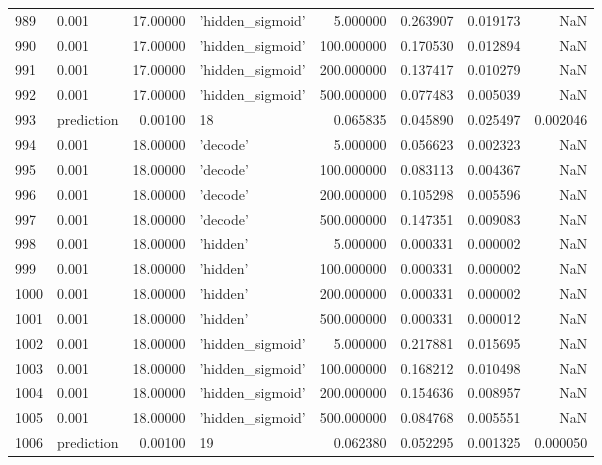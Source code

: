 \documentclass[10pt,a4paper]{article}
\begin{document}
\begin{tabular}{llrlrrrr}
989  &       0.001 &  17.00000 &   'hidden\_sigmoid' &    5.000000 &  0.263907 &  0.019173 &       NaN \\
990  &       0.001 &  17.00000 &   'hidden\_sigmoid' &  100.000000 &  0.170530 &  0.012894 &       NaN \\
991  &       0.001 &  17.00000 &   'hidden\_sigmoid' &  200.000000 &  0.137417 &  0.010279 &       NaN \\
992  &       0.001 &  17.00000 &   'hidden\_sigmoid' &  500.000000 &  0.077483 &  0.005039 &       NaN \\
993  &  prediction &   0.00100 &                 18 &    0.065835 &  0.045890 &  0.025497 &  0.002046 \\
994  &       0.001 &  18.00000 &           'decode' &    5.000000 &  0.056623 &  0.002323 &       NaN \\
995  &       0.001 &  18.00000 &           'decode' &  100.000000 &  0.083113 &  0.004367 &       NaN \\
996  &       0.001 &  18.00000 &           'decode' &  200.000000 &  0.105298 &  0.005596 &       NaN \\
997  &       0.001 &  18.00000 &           'decode' &  500.000000 &  0.147351 &  0.009083 &       NaN \\
998  &       0.001 &  18.00000 &           'hidden' &    5.000000 &  0.000331 &  0.000002 &       NaN \\
999  &       0.001 &  18.00000 &           'hidden' &  100.000000 &  0.000331 &  0.000002 &       NaN \\
1000 &       0.001 &  18.00000 &           'hidden' &  200.000000 &  0.000331 &  0.000002 &       NaN \\
1001 &       0.001 &  18.00000 &           'hidden' &  500.000000 &  0.000331 &  0.000012 &       NaN \\
1002 &       0.001 &  18.00000 &   'hidden\_sigmoid' &    5.000000 &  0.217881 &  0.015695 &       NaN \\
1003 &       0.001 &  18.00000 &   'hidden\_sigmoid' &  100.000000 &  0.168212 &  0.010498 &       NaN \\
1004 &       0.001 &  18.00000 &   'hidden\_sigmoid' &  200.000000 &  0.154636 &  0.008957 &       NaN \\
1005 &       0.001 &  18.00000 &   'hidden\_sigmoid' &  500.000000 &  0.084768 &  0.005551 &       NaN \\
1006 &  prediction &   0.00100 &                 19 &    0.062380 &  0.052295 &  0.001325 &  0.000050 \\

\end{tabular}
\end{document}
